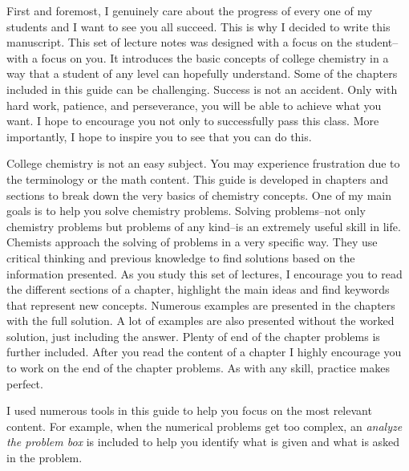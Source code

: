 \documentclass[main.tex]{subfiles}
\begin{document}
\pagestyle{style1}

\begin{fullwidth}
\begin{multicols*}{2}
First and foremost, I genuinely care about the progress of every one of my students and I want to see you all succeed. This is why I decided to write this manuscript. This set of lecture notes was designed with a focus on the student--with a focus on you. It introduces the basic concepts of college chemistry in a way that a student of any level can hopefully understand. Some of the chapters included in this guide can be challenging. Success is not an accident. Only with hard work, patience, and perseverance, you will be able to achieve what you want. I hope to encourage you not only to successfully pass this class. More importantly, I hope to inspire you to see that you can do this. 

College chemistry is not an easy subject. You may experience frustration due to the terminology or the math content. This guide is developed in chapters and sections to break down the very basics of chemistry concepts. One of my main goals is to help you solve chemistry problems. Solving problems--not only chemistry problems but problems of any kind--is an extremely useful skill in life. Chemists approach the solving of problems in a very specific way. They use critical thinking and previous knowledge to find solutions based on the information presented. As you study this set of lectures, I encourage you to read the different sections of a chapter, highlight the main ideas and find keywords that represent new concepts. Numerous examples are presented in the chapters with the full solution. A lot of examples are also presented without the worked solution, just including the answer. Plenty of end of the chapter problems is further included. After you read the content of a chapter I highly encourage you to work on the end of the chapter problems. As with any skill, practice makes perfect.

I used numerous tools in this guide to help you focus on the most relevant content. For example, when the numerical problems get too complex, an \emph{analyze the problem box} is included to help you identify what is given and what is asked in the problem.


\end{multicols*}
\end{fullwidth}
\end{document}
